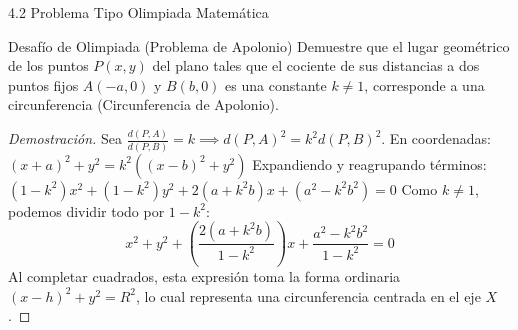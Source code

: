 \documentclass[10pt,aspectratio=169,spanish]{beamer}
\begin{document}
\begin{frame}{4.2 Problema Tipo Olimpiada Matemática}
\begin{block}{Desafío de Olimpiada (Problema de Apolonio)}
Demuestre que el lugar geométrico de los puntos $P(x,y)$ del plano tales que el cociente de sus distancias a dos puntos fijos $A(-a,0)$ y $B(b,0)$ es una constante $k \neq 1$, corresponde a una circunferencia (Circunferencia de Apolonio).
\end{block}

\pause
\begin{proof}[Demostración]
Sea $\frac{d(P,A)}{d(P,B)} = k \implies d(P,A)^2 = k^2 d(P,B)^2$. En coordenadas:
$
  (x+a)^2 + y^2 = k^2 \left( (x-b)^2 + y^2 \right)
$
Expandiendo y reagrupando términos:
$
  (1 - k^2)x^2 + (1 - k^2)y^2 + 2(a + k^2 b)x + (a^2 - k^2 b^2) = 0
$
Como $k \neq 1$, podemos dividir todo por $1 - k^2$:
\[
  x^2 + y^2 + \left(\frac{2(a + k^2 b)}{1 - k^2}\right)x + \frac{a^2 - k^2 b^2}{1 - k^2} = 0
\]
Al completar cuadrados, esta expresión toma la forma ordinaria $(x-h)^2 + y^2 = R^2$, lo cual representa una circunferencia centrada en el eje $X$.
\end{proof}
\end{frame}
\end{document}
